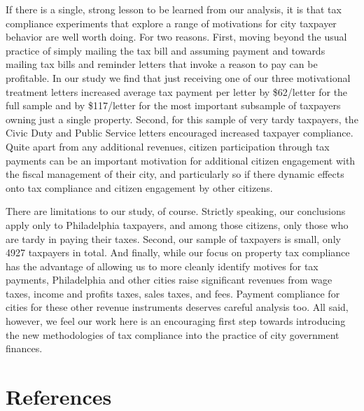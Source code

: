 \documentclass[12pt,titlepage]{article}
\begin{document}
If there is a single, strong lesson to be learned from our analysis,
it is that tax compliance experiments that explore a range of
motivations for city taxpayer behavior are well worth doing.  For two
reasons.  First, moving beyond the usual practice of simply mailing
the tax bill and assuming payment and towards mailing tax bills and
reminder letters that invoke a reason to pay can be profitable.  In
our study we find that just receiving one of our three motivational
treatment letters increased average tax payment per letter by
\$62/letter for the full sample and by \$117/letter for the most
important subsample of taxpayers owning just a single property.
Second, for this sample of very tardy taxpayers, the Civic Duty and
Public Service letters encouraged increased taxpayer compliance.
Quite apart from any additional revenues, citizen participation
through tax payments can be an important motivation for additional
citizen engagement with the fiscal management of their city, and
particularly so if there dynamic effects onto tax compliance and
citizen engagement by other citizens.

There are limitations to our study, of course.  Strictly speaking, our
conclusions apply only to Philadelphia taxpayers, and among those
citizens, only those who are tardy in paying their taxes. Second, our
sample of taxpayers is small, only 4927 taxpayers in total.  And
finally, while our focus on property tax compliance has the advantage
of allowing us to more cleanly identify motives for tax payments,
Philadelphia and other cities raise significant revenues from wage
taxes, income and profits taxes, sales taxes, and fees.  Payment
compliance for cities for these other revenue instruments deserves
careful analysis too.  All said, however, we feel our work here is an
encouraging first step towards introducing the new methodologies of
tax compliance into the practice of city government finances.

\newpage

\section*{References}
\end{document}
